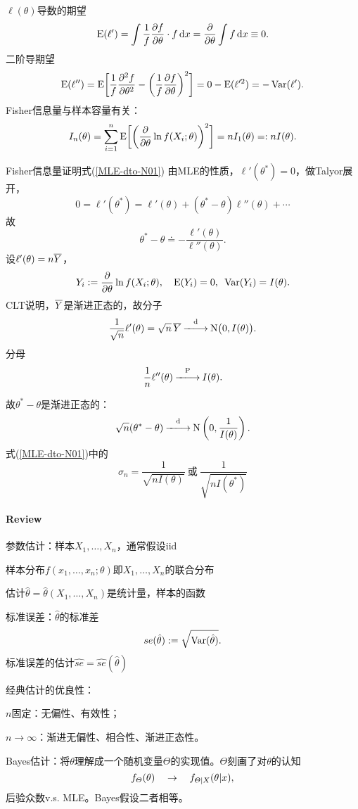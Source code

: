 $\ell(\theta)$导数的期望
\[
	\E(\ell')=\int\frac1f\pv f\theta\cdot f\d x=\pp\theta\int f\d x\equiv 0.
\]
二阶导期望
\[
	\E(\ell'')=\E\biggl[\frac1f\pv[2]f\theta-\biggl(\frac1f\pv f\theta\biggr)^2\biggr]=0-\E(\ell'^2)=-\Var(\ell').
\]
Fisher信息量与样本容量有关：
\[
	I_n(\theta)=\sum_{i=1}^n\E\biggl[\biggl(\pp\theta\ln f(X_i;\theta)\biggr)^2\biggr]=nI_1(\theta)=:nI(\theta).
\]
\begin{example}{Fisher信息量证明式(\ref{MLE-dto-N01})}{}
	由MLE的性质，$\ell'(\theta^\ast)=0$，做Talyor展开，
	\[
		0=\ell'(\theta^\ast)=\ell'(\theta)+(\theta^\ast-\theta)\ell''(\theta)+\cdots
	\]
	故
	\[
		\theta^\ast-\theta\doteq-\frac{\ell'(\theta)}{\ell''(\theta)}.
	\]
	设$\ell'(\theta)=n\avg Y$，
	\[
		Y_i:=\pp\theta\ln f(X_i;\theta),\quad\E(Y_i)=0,\enspace\Var(Y_i)=I(\theta).
	\]
	CLT说明，$\avg Y$是渐进正态的，故分子
	\[
		\frac1{\sqrt n}\ell'(\theta)=\sqrt n\,\avg Y\dto\Norm\bigkh{0,I(\theta)}.
	\]
	分母
	\[
		\frac1n\ell''(\theta)\pto I(\theta).
	\]

	故$\theta^\ast-\theta$是渐进正态的：
	\[
		\sqrt n(\theta^\ast-\theta)\dto\Norm\kh{0,\frac1{I(\theta)}}.
	\]
	式(\ref{MLE-dto-N01})中的 
	\[
		\sigma_n=\frac1{\sqrt{nI(\theta)}}~\text{或}~\frac1{\sqrt{nI(\theta^\ast)}}
	\]
\end{example}
\paragraph{Review}
\begin{compactenum}
	\item 参数估计：样本$X_1,\ldots,X_n$，通常假设iid
	
	样本分布$f(x_1,\ldots,x_n;\theta)$即$X_1,\ldots,X_n$的联合分布

	估计$\hat\theta=\hat\theta(X_1,\ldots,X_n)$是统计量，样本的函数

	标准误差：$\hat\theta$的标准差
	\begin{align}
		se(\hat\theta):=\sqrt{\Var(\hat\theta)}.
	\end{align}
	标准误差的估计$\hat{se}=\hat{se}(\hat\theta)$
	\item 经典估计的优良性：
	
	$n$固定：无偏性、有效性；

	$n\to\infty$：渐进无偏性、相合性、渐进正态性。

	\item Bayes估计：将$\theta$理解成一个随机变量$\varTheta$的实现值。$\varTheta$刻画了对$\theta$的认知
	\[
		f_\varTheta(\theta)\turnto f_{\varTheta|X}(\theta|x),
	\]
	后验众数v.s. MLE。Bayes假设二者相等。
\end{compactenum}
